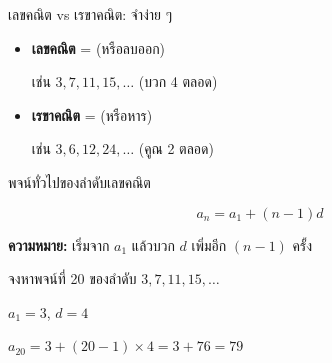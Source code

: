 \documentclass[11pt, aspectratio=169]{beamer}
\begin{document}
\begin{frame}{เลขคณิต vs เรขาคณิต: จำง่าย ๆ}
  \begin{intuition}[จำง่าย ๆ]
    \begin{itemize}
      \item \textbf{เลขคณิต} =  (หรือลบออก)

      \quad เช่น $3, 7, 11, 15, \ldots$ (บวก 4 ตลอด)

      \item \textbf{เรขาคณิต} =  (หรือหาร)

      \quad เช่น $3, 6, 12, 24, \ldots$ (คูณ 2 ตลอด)
    \end{itemize}
  \end{intuition}
\end{frame}

\begin{frame}{พจน์ทั่วไปของลำดับเลขคณิต}
  \begin{explanation}[สูตรพจน์ที่ $n$]
    \[
      a_n = a_1 + (n-1)d
    \]

    \textbf{ความหมาย:} เริ่มจาก $a_1$ แล้วบวก $d$ เพิ่มอีก $(n-1)$ ครั้ง
  \end{explanation}

  \begin{exambox}
    จงหาพจน์ที่ 20 ของลำดับ $3, 7, 11, 15, \ldots$

    \medskip
    $a_1 = 3$, $d = 4$

    $a_{20} = 3 + (20-1) \times 4 = 3 + 76 = 79$
  \end{exambox}
\end{frame}





\end{document}
